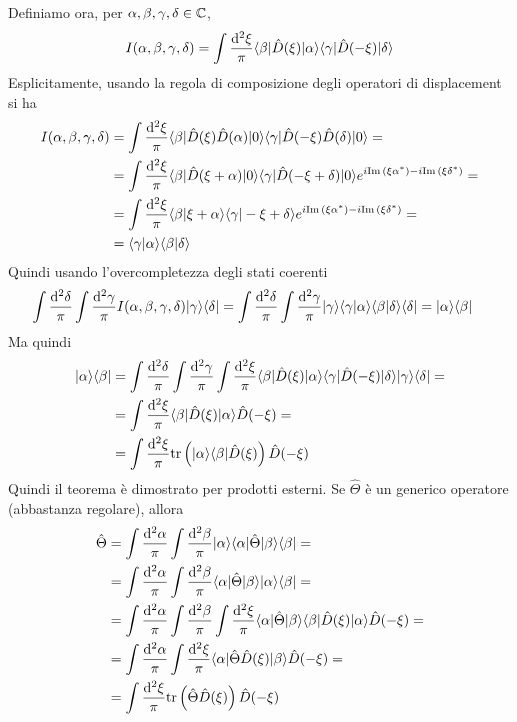 \documentclass[a4paper, 11pt]{article}
\newcommand{\tr}{\mathrm{tr}}
\renewcommand{\ket}[1]{| #1\rangle}
\renewcommand{\bra}[1]{\langle #1|}
\begin{document}
Definiamo ora, per $\alpha,\beta,\gamma,\delta\in\mathbb{C}$,
\[I(\alpha,\beta,\gamma,\delta)=\int\frac{\mathrm{d} ^2\xi}{\pi}\langle\beta|\hat{D}(\xi)|\alpha\rangle\langle\gamma|\hat{D}(-\xi)|\delta\rangle\]
Esplicitamente, usando la regola di composizione degli operatori di displacement si ha
\begin{align*}
	I(\alpha,\beta,\gamma,\delta)&=\int\frac{\mathrm{d} ^2\xi}{\pi}\langle\beta|\hat{D}(\xi)\hat{D}(\alpha)|0\rangle\langle\gamma|\hat{D}(-\xi)\hat{D}(\delta)|0\rangle=\\&=\int\frac{\mathrm{d} ^2\xi}{\pi}\langle\beta|\hat{D}(\xi+\alpha)|0\rangle\langle\gamma|\hat{D}(-\xi+\delta)|0\rangle e^{i\mathrm{Im}\,(\xi\alpha^*)-i\mathrm{Im}\,(\xi\delta^*)}=\\&=\int\frac{\mathrm{d} ^2\xi}{\pi}\langle \beta\vert\xi+\alpha\rangle\langle \gamma\vert-\xi+\delta\rangle e^{i\mathrm{Im}\,(\xi\alpha^*)-i\mathrm{Im}\,(\xi\delta^*)}=\\&=\langle \gamma\vert\alpha\rangle\langle \beta\vert\delta\rangle
\end{align*}
Quindi usando l'overcompletezza degli stati coerenti
\begin{align*}
	\int\frac{\d ^2\delta}{\pi}\int\frac{\d ^2\gamma}{\pi}I(\alpha,\beta,\gamma,\delta)\ket\gamma\bra\delta&=\int\frac{\d ^2\delta}{\pi}\int\frac{\d ^2\gamma}{\pi}\ket\gamma\braket{\gamma}{\alpha}\braket{\beta}{\delta}\bra{\delta}=\ket\alpha\bra \beta
\end{align*}
Ma quindi
\begin{align*}
	\ket\alpha\bra \beta&=\int\frac{\d ^2\delta}{\pi}\int\frac{\d ^2\gamma}{\pi}\int\frac{\d ^2\xi}{\pi}\braketop{\beta}{\hat{D}(\xi)}{\alpha}\braketop{\gamma}{\hat{D}(-\xi)}{\delta}\ket\gamma\bra \delta=\\&=\int\frac{\d ^2\xi}{\pi}\braketop{\beta}{\hat{D}(\xi)}{\alpha}\hat{D}(-\xi)=\\&=\int\frac{\d^2\xi}{\pi}\tr\left(\ket\alpha\bra \beta\hat{D}(\xi)\right)\hat{D}(-\xi)
\end{align*}
Quindi il teorema è dimostrato per prodotti esterni. Se $\hat{\Theta}$ è un generico operatore (abbastanza regolare), allora
\begin{align*}
	\hat{\Theta}&=\int\frac{\d ^2\alpha}{\pi}\int\frac{\d ^2\beta}{\pi}\ket\alpha\braketop{\alpha}{\hat{\Theta}}{\beta}\bra {\beta}=\\&=\int\frac{\d ^2\alpha}{\pi}\int\frac{\d^2\beta}{\pi}\braketop{\alpha}{\hat{\Theta}}{\beta}\ket\alpha\bra \beta=\\&=\int\frac{\d ^2\alpha}{\pi}\int\frac{\d^2\beta}{\pi}\int\frac{\d^2\xi}{\pi}\braketop{\alpha}{\hat{\Theta}}{\beta}\braketop{\beta}{\hat{D}(\xi)}{\alpha}\hat{D}(-\xi)=\\&=\int\frac{\d ^2\alpha}{\pi}\int\frac{\d^2\xi}{\pi}\braketop{\alpha}{\hat{\Theta}\hat{D}(\xi)}{\beta}\hat{D}(-\xi)=\\&=\int\frac{\d ^2\xi}{\pi}\tr\left(\hat{\Theta}\hat{D}(\xi)\right)\hat{D}(-\xi)
\end{align*}
\end{document}
